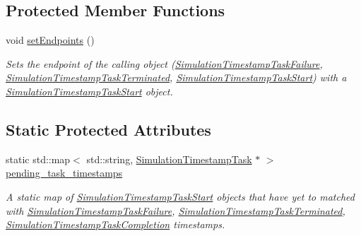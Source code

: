 \subsection*{Protected Member Functions}
\begin{DoxyCompactItemize}
\item 
\mbox{\label{classwrench_1_1_simulation_timestamp_task_a8d509ab4bfc8c1ae1ad9bf44dd085969}} 
void \hyperlink{classwrench_1_1_simulation_timestamp_task_a8d509ab4bfc8c1ae1ad9bf44dd085969}{set\+Endpoints} ()
\begin{DoxyCompactList}\small\item\em Sets the endpoint of the calling object (\hyperlink{classwrench_1_1_simulation_timestamp_task_failure}{Simulation\+Timestamp\+Task\+Failure}, \hyperlink{classwrench_1_1_simulation_timestamp_task_terminated}{Simulation\+Timestamp\+Task\+Terminated}, \hyperlink{classwrench_1_1_simulation_timestamp_task_start}{Simulation\+Timestamp\+Task\+Start}) with a \hyperlink{classwrench_1_1_simulation_timestamp_task_start}{Simulation\+Timestamp\+Task\+Start} object. \end{DoxyCompactList}\end{DoxyCompactItemize}
\subsection*{Static Protected Attributes}
\begin{DoxyCompactItemize}
\item 
\mbox{\label{classwrench_1_1_simulation_timestamp_task_a2700cf4cf255e0c7e5fbccf0cdc13ae5}} 
static std\+::map$<$ std\+::string, \hyperlink{classwrench_1_1_simulation_timestamp_task}{Simulation\+Timestamp\+Task} $\ast$ $>$ \hyperlink{classwrench_1_1_simulation_timestamp_task_a2700cf4cf255e0c7e5fbccf0cdc13ae5}{pending\+\_\+task\+\_\+timestamps}
\begin{DoxyCompactList}\small\item\em A static map of \hyperlink{classwrench_1_1_simulation_timestamp_task_start}{Simulation\+Timestamp\+Task\+Start} objects that have yet to matched with \hyperlink{classwrench_1_1_simulation_timestamp_task_failure}{Simulation\+Timestamp\+Task\+Failure}, \hyperlink{classwrench_1_1_simulation_timestamp_task_terminated}{Simulation\+Timestamp\+Task\+Terminated}, \hyperlink{classwrench_1_1_simulation_timestamp_task_completion}{Simulation\+Timestamp\+Task\+Completion} timestamps. \end{DoxyCompactList}\end{DoxyCompactItemize}
